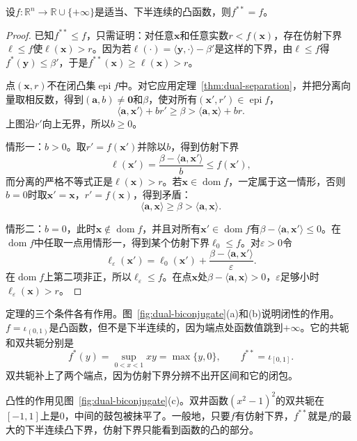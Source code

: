 \begin{theorem}
 \label{thm:dual-fenchel-moreau}
 设$f:\mathbb{R}^n\to\mathbb{R}\cup\{+\infty\}$是适当、下半连续的凸函数，则$f^{**}=f$。
\end{theorem}

\begin{proof}
 已知$f^{**}\leq f$，只需证明：对任意$\bm{x}$和任意实数$r<f(\bm{x})$，存在仿射下界$\ell\leq f$使$\ell(\bm{x})>r$。因为若$\ell(\cdot)=\langle\bm{y},\cdot\rangle-\beta'$是这样的下界，由$\ell\leq f$得$f^*(\bm{y})\leq\beta'$，于是$f^{**}(\bm{x})\geq\ell(\bm{x})>r$。

 点$(\bm{x},r)$不在闭凸集$\operatorname{epi}f$中。对它应用定理~\ref{thm:dual-separation}，并把分离向量取相反数，得到$(\bm{a},b)\neq\bm{0}$和$\beta$，使对所有$(\bm{x}',r')\in\operatorname{epi}f$，
 \[
  \langle\bm{a},\bm{x}'\rangle+br'\geq\beta>\langle\bm{a},\bm{x}\rangle+br.
 \]
 上图沿$r'$向上无界，所以$b\geq0$。

 情形一：$b>0$。取$r'=f(\bm{x}')$并除以$b$，得到仿射下界
 \[
  \ell(\bm{x}')=\frac{\beta-\langle\bm{a},\bm{x}'\rangle}{b}\leq f(\bm{x}'),
 \]
 而分离的严格不等式正是$\ell(\bm{x})>r$。若$\bm{x}\in\operatorname{dom}f$，一定属于这一情形，否则$b=0$时取$\bm{x}'=\bm{x}$，$r'=f(\bm{x})$，得到矛盾：
 \[
  \langle\bm{a},\bm{x}\rangle\geq\beta>\langle\bm{a},\bm{x}\rangle.
 \]

 情形二：$b=0$，此时$\bm{x}\notin\operatorname{dom}f$，并且对所有$\bm{x}'\in\operatorname{dom}f$有$\beta-\langle\bm{a},\bm{x}'\rangle\leq0$。在$\operatorname{dom}f$中任取一点用情形一，得到某个仿射下界$\ell_0\leq f$。对$\varepsilon>0$令
 \[
  \ell_\varepsilon(\bm{x}')=\ell_0(\bm{x}')+\frac{\beta-\langle\bm{a},\bm{x}'\rangle}{\varepsilon}.
 \]
 在$\operatorname{dom}f$上第二项非正，所以$\ell_\varepsilon\leq f$。在点$\bm{x}$处$\beta-\langle\bm{a},\bm{x}\rangle>0$，$\varepsilon$足够小时$\ell_\varepsilon(\bm{x})>r$。
\end{proof}

定理的三个条件各有作用。图~\ref{fig:dual-biconjugate}(a)和(b)说明闭性的作用。$f=\iota_{(0,1)}$是凸函数，但不是下半连续的，因为端点处函数值跳到$+\infty$。它的共轭和双共轭分别是
\[
 f^*(y)=\sup_{0<x<1}xy=\max\{y,0\},\qquad f^{**}=\iota_{[0,1]}.
\]
双共轭补上了两个端点，因为仿射下界分辨不出开区间和它的闭包。

凸性的作用见图~\ref{fig:dual-biconjugate}(c)。双井函数$(x^2-1)^2$的双共轭在$[-1,1]$上是$0$，中间的鼓包被抹平了。一般地，只要$f$有仿射下界，$f^{**}$就是$f$的最大的下半连续凸下界，仿射下界只能看到函数的凸的部分。

